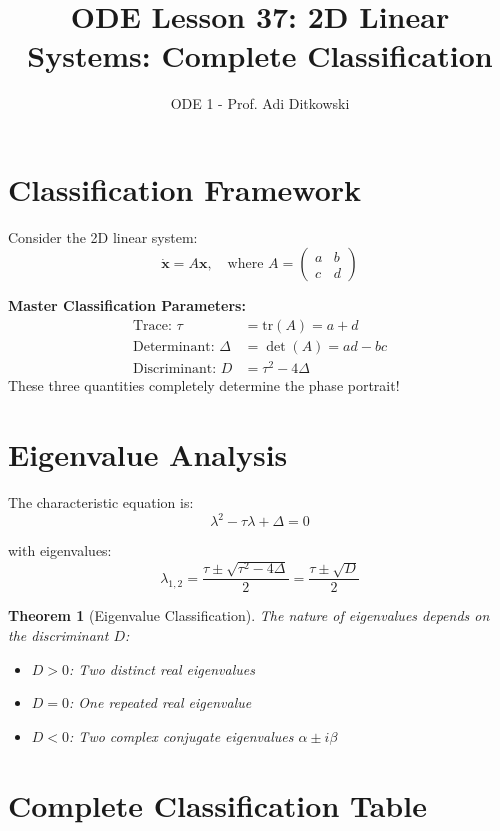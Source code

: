 \documentclass[12pt]{article}
\title{ODE Lesson 37: 2D Linear Systems: Complete Classification}
\author{ODE 1 - Prof. Adi Ditkowski}
\date{}
\newtheorem{theorem}{Theorem}
\begin{document}
\maketitle

\section{Classification Framework}

Consider the 2D linear system:
$$\dot{\mathbf{x}} = A\mathbf{x}, \quad \text{where } A = \begin{pmatrix} a & b \\ c & d \end{pmatrix}$$

\begin{keypoint}
\textbf{Master Classification Parameters:}
\begin{align}
\text{Trace: } \tau &= \text{tr}(A) = a + d \\
\text{Determinant: } \Delta &= \det(A) = ad - bc \\
\text{Discriminant: } D &= \tau^{2} - 4\Delta
\end{align}
These three quantities completely determine the phase portrait!
\end{keypoint}

\section{Eigenvalue Analysis}

The characteristic equation is:
$$\lambda^{2} - \tau\lambda + \Delta = 0$$

with eigenvalues:
$$\lambda_{1,2} = \frac{\tau \pm \sqrt{\tau^{2} - 4\Delta}}{2} = \frac{\tau \pm \sqrt{D}}{2}$$

\begin{theorem}[Eigenvalue Classification]
The nature of eigenvalues depends on the discriminant $D$:
\begin{itemize}
    \item $D > 0$: Two distinct real eigenvalues
    \item $D = 0$: One repeated real eigenvalue
    \item $D < 0$: Two complex conjugate eigenvalues $\alpha \pm i\beta$
\end{itemize}
\end{theorem}

\section{Complete Classification Table}
\end{document}
